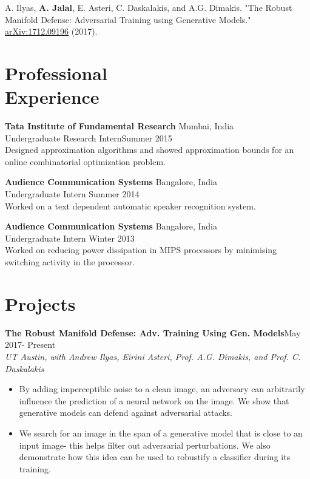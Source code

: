 \documentclass[margin, 11pt]{res} %
\begin{document}
\begin{resume}
A. Ilyas, {\bf A. Jalal}, E. Asteri, C. Daskalakis, and A.G. Dimakis. "The Robust Manifold Defense: Adversarial Training using Generative Models." \href{https://arxiv.org/abs/1712.09196}{arXiv:1712.09196} (2017). 

\section{\large Professional \\ Experience} 
{\bf Tata Institute of Fundamental Research} \hfill Mumbai, India\\
Undergraduate Research Intern\hfill Summer 2015\\
Designed approximation algorithms and showed approximation bounds for an online combinatorial optimization problem.

{\bf Audience Communication Systems} \hfill Bangalore, India\\
Undergraduate Intern \hfill Summer 2014\\
Worked on a text dependent automatic speaker recognition system.

{\bf Audience Communication Systems} \hfill Bangalore, India\\
Undergraduate Intern \hfill Winter 2013\\
Worked on reducing power dissipation in MIPS processors by minimising switching activity
in the processor.

\section{\large Projects}
{\bf The Robust Manifold Defense: Adv. Training Using Gen. Models}\hfill May 2017- Present\\
{\sl UT Austin, with Andrew Ilyas, Eirini Asteri, Prof. A.G. Dimakis, and Prof. C. Daskalakis}
\begin{itemize}\itemsep -2pt
	\item By adding imperceptible noise to a clean image, an adversary can arbitrarily influence the prediction of a neural network on the image. We show that generative models can defend against adversarial attacks.
	\item We search for an image in the span of a generative model that is close to an input image- this helps filter out adversarial perturbations. We also demonstrate how this idea can be used to robustify a classifier during its training.
\end{itemize}


\end{resume}
\end{document}
